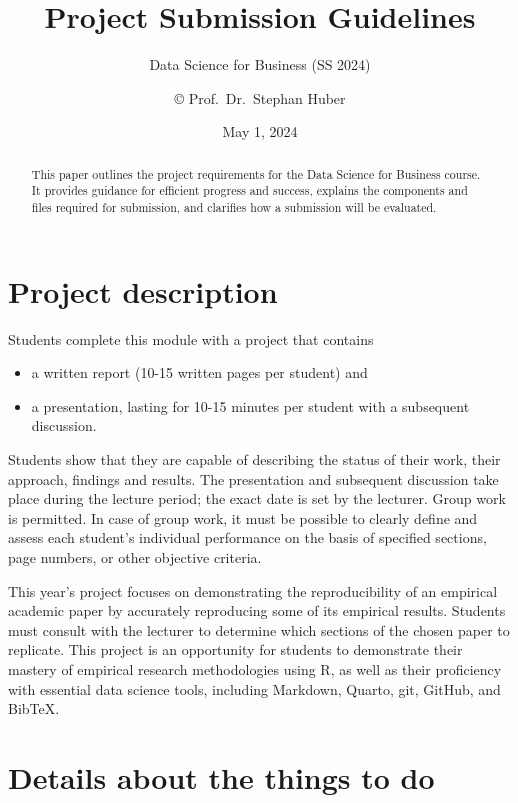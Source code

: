 \documentclass[
  a4paper,
  onecolumn,
  oneside]{scrartcl}
\title{Project Submission Guidelines}
\subtitle{Data Science for Business (SS 2024)}
\author{© Prof.~Dr.~Stephan Huber}
\affil{%
          Hochschule Fresenius - University of Applied Science
        }
\affil{%
          Email: stephan.huber@hs-fresenius.de
        }
\affil{%
          Website: https://hubchev.github.io
        }
\date{May 1, 2024}
\providecommand{\tightlist}{%
  \setlength{\itemsep}{0pt}\setlength{\parskip}{0pt}}\usepackage{longtable,booktabs,array}
\renewcommand*\contentsname{Table of contents}
\newcommand\contentsname{Table of contents}
\begin{document}
\maketitle
\begin{abstract}
This paper outlines the project requirements for the Data Science for
Business course. It provides guidance for efficient progress and
success, explains the components and files required for submission, and
clarifies how a submission will be evaluated.
\end{abstract}

\renewcommand*\contentsname{Table of contents}
{
\hypersetup{linkcolor=}
\setcounter{tocdepth}{5}
\tableofcontents
}
\clearpage

\section{Project description}\label{sec-intro}

Students complete this module with a project that contains

\begin{itemize}
\tightlist
\item
  a written report (10-15 written pages per student) and
\item
  a presentation, lasting for 10-15 minutes per student with a
  subsequent discussion.
\end{itemize}

Students show that they are capable of describing the status of their
work, their approach, findings and results. The presentation and
subsequent discussion take place during the lecture period; the exact
date is set by the lecturer. Group work is permitted. In case of group
work, it must be possible to clearly define and assess each student's
individual performance on the basis of specified sections, page numbers,
or other objective criteria.

This year's project focuses on demonstrating the reproducibility of an
empirical academic paper by accurately reproducing some of its empirical
results. Students must consult with the lecturer to determine which
sections of the chosen paper to replicate. This project is an
opportunity for students to demonstrate their mastery of empirical
research methodologies using R, as well as their proficiency with
essential data science tools, including Markdown, Quarto, git, GitHub,
and BibTeX.

\section{Details about the things to
do}\label{details-about-the-things-to-do}
\end{document}
